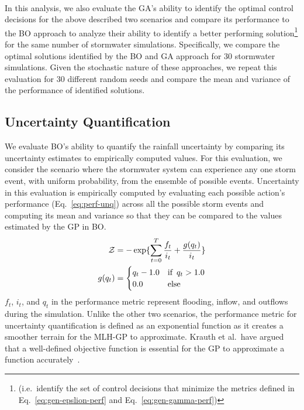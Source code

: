 \

In this analysis, we also evaluate the GA's ability to identify the optimal control decisions for the above described two scenarios and compare its performance to the BO approach to analyze their ability to identify a better performing solution\footnote{(i.e.\ identify the set of control decisions that minimize the metrics defined in Eq.~\ref{eq:gen-epslion-perf} and Eq.~\ref{eq:gen-gamma-perf})} for the same number of stormwater simulations.
Specifically, we compare the optimal solutions identified by the BO and GA approach for 30 stormwater simulations.
Given the stochastic nature of these approaches, we repeat this evaluation for 30 different random seeds and compare the mean and variance of the performance of identified solutions.



\subsection{Uncertainty Quantification}\label{sec:unq}
We evaluate BO's ability to quantify the rainfall uncertainty by comparing its uncertainty estimates to empirically computed values.
For this evaluation, we consider the scenario where the stormwater system can experience any one storm event, with uniform probability, from the ensemble of possible events.
Uncertainty in this evaluation is empirically computed by evaluating  each possible action's performance (Eq.~\ref{eq:perf-unq}) across all the possible storm events and computing its mean and variance so that they can be compared to the values estimated by the GP in BO\@.
\begin{subequations}\label{eq:perf-unq}
\begin{align}
	\mathcal{Z} &= - \exp\{ \sum_{t=0}^T  \frac{f_t}{i_t} + \frac{g(q_{t})}{i_t} \} \\
	g(q_{t}) &=
      \begin{cases}
        q_{t} - 1.0
                   & \text{if \,} q_{t} > 1.0 \\
	      0.0     & \text{else}
      \end{cases}
\end{align}
\end{subequations}
$f_t$, $i_t$, and $q_t$ in the performance metric represent flooding, inflow, and outflows during the simulation.
Unlike the other two scenarios, the performance metric for uncertainty quantification is defined as an exponential function as it creates a smoother terrain for the MLH-GP to approximate.
Krauth et al.\ have argued that a well-defined objective function is essential for the GP to approximate a function accurately~\cite{Krauth_Bonilla_Cutajar_Filippone}.

